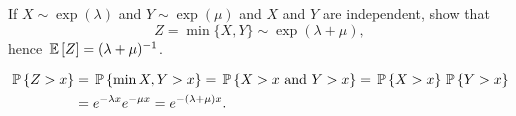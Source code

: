 \begin{question}\label{ex:10}
  If $X\sim\exp(\lambda)$ and $Y\sim\exp(\mu)$ and $X$ and $Y$ are
  independent, show that 
  \begin{equation*}
Z=\min\{X,Y\}\sim\exp(\lambda+\mu),
  \end{equation*}
hence $\E Z = (\lambda+\mu)^{-1}$.
  \begin{solution}
    \begin{equation*}
      \begin{split}
      \P{Z>x} 
&= \P{\min{X,Y}>x} = \P{X>x\text{ and } Y>x} = \P{X>x}\P{Y>x} \\
&= e^{-\lambda x} e^{-\mu x} = e^{-(\lambda+\mu)x}.
      \end{split}
    \end{equation*}
  \end{solution}

\end{question}

